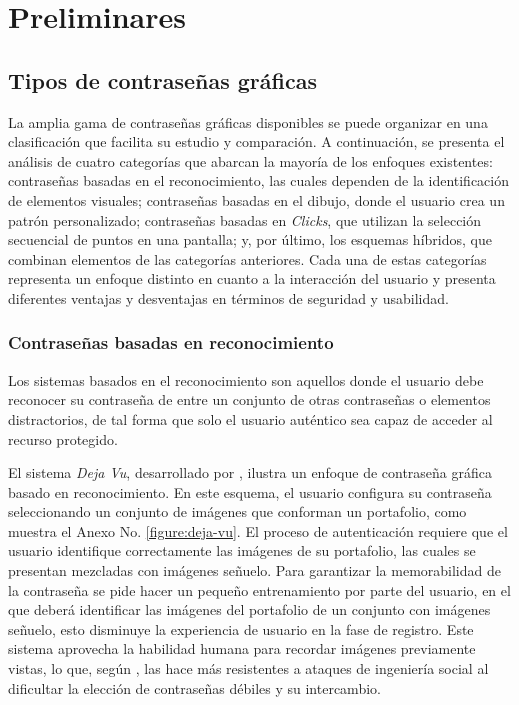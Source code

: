 \chapter{Preliminares}\label{chapter:state-of-the-art}
\section{Tipos de contraseñas gráficas}
La amplia gama de contraseñas gráficas disponibles se puede organizar en una clasificación que facilita su estudio y comparación. A continuación, se presenta el análisis de cuatro categorías que abarcan la mayoría de los enfoques existentes: contraseñas basadas en el reconocimiento, las cuales dependen de la identificación de elementos visuales; contraseñas basadas en el dibujo, donde el usuario crea un patrón personalizado; contraseñas basadas en \textit{Clicks}, que utilizan la selección secuencial de puntos en una pantalla; y, por último, los esquemas híbridos, que combinan elementos de las categorías anteriores. Cada una de estas categorías representa un enfoque distinto en cuanto a la interacción del usuario y presenta diferentes ventajas y desventajas en términos de seguridad y usabilidad.  
\subsection{Contraseñas basadas en reconocimiento}
Los sistemas basados en el reconocimiento son aquellos donde el usuario debe reconocer su contraseña de entre un conjunto de otras contraseñas o elementos distractorios, de tal forma que solo el usuario auténtico sea capaz de acceder al recurso protegido.

 
El sistema \textit{Deja Vu}, desarrollado por \cite{dhamija2000deja}, ilustra un enfoque de contraseña gráfica basado en reconocimiento. En este esquema, el usuario configura su contraseña seleccionando un conjunto de imágenes que conforman un portafolio, como muestra el Anexo No. \ref{figure:deja-vu}. El proceso de autenticación requiere que el usuario identifique correctamente las imágenes de su portafolio, las cuales se presentan mezcladas con imágenes señuelo. Para garantizar la memorabilidad de la contraseña se pide hacer un pequeño entrenamiento por parte del usuario, en el que deberá identificar las imágenes del portafolio de un conjunto con imágenes señuelo, esto disminuye la experiencia de usuario en la fase de registro. Este sistema aprovecha la habilidad humana para recordar imágenes previamente vistas, lo que, según \cite{dhamija2000deja}, las hace más resistentes a ataques de ingeniería social al dificultar la elección de contraseñas débiles y su intercambio.


